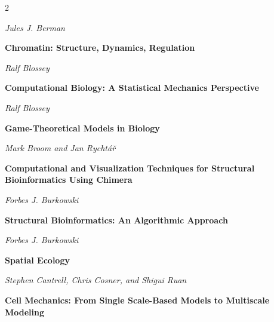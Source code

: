 \begin{multicols}{2}
\begin{minipage}{\linewidth}
\textit{Jules J. Berman}
\end{minipage}\par\medskip
\par\noindent\begin{minipage}{\linewidth}
\raggedright
\textbf{Chromatin: Structure, Dynamics, Regulation}\par
\textit{Ralf Blossey}
\end{minipage}\par\medskip
\par\noindent\begin{minipage}{\linewidth}
\raggedright
\textbf{Computational Biology: A Statistical Mechanics Perspective}\par
\textit{Ralf Blossey}
\end{minipage}\par\medskip
\par\noindent\begin{minipage}{\linewidth}
\raggedright
\textbf{Game-Theoretical Models in Biology}\par
\textit{Mark Broom and Jan Rychtář}
\end{minipage}\par\medskip
\par\noindent\begin{minipage}{\linewidth}
\raggedright
\textbf{Computational and Visualization Techniques for Structural Bioinformatics Using Chimera}\par
\textit{Forbes J. Burkowski}
\end{minipage}\par\medskip
\par\noindent\begin{minipage}{\linewidth}
\raggedright
\textbf{Structural Bioinformatics: An Algorithmic Approach}\par
\textit{Forbes J. Burkowski}
\end{minipage}\par\medskip
\par\noindent\begin{minipage}{\linewidth}
\raggedright
\textbf{Spatial Ecology}\par
\textit{Stephen Cantrell, Chris Cosner, and Shigui Ruan}
\end{minipage}\par\medskip
\par\noindent\begin{minipage}{\linewidth}
\raggedright
\textbf{Cell Mechanics: From Single Scale-Based Models to Multiscale Modeling}\par

\end{minipage}
\end{multicols}
